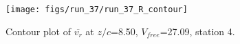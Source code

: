 \begin{figure}[H]
\centering
\texttt{[image: figs/run\_37/run\_37\_R\_contour]}
\caption{Contour plot of $\overline{v_{r}}$ at $z/c$=8.50, $V_{free}$=27.09, station 4.}
\label{fig:run_37_R_contour}
\end{figure}


